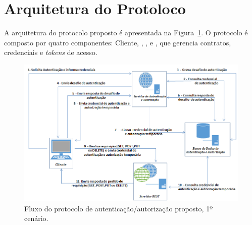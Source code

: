 


\section{Arquitetura do Protoloco}\label{sec:ArqProtocolo}

A arquitetura do protocolo proposto é apresentada na Figura~\ref{fig:arquiteturaprotocolo}. O protocolo é composto por quatro componentes: Cliente, \servidorAA, \servidorRest, e \servidorBD, que gerencia contratos, credenciais e \emph{tokens} de acesso.

\begin{figure}[!htb]
    \centering
    \includegraphics[width=1.0\textwidth]{arquitetura_protocolo.png}
    \caption{Fluxo do protocolo de autenticação/autorização proposto, 1º cenário.}
    \label{fig:arquiteturaprotocolo}
\end{figure}

